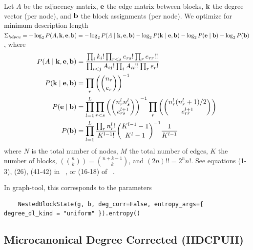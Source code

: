 \documentclass[aps,pre,superscriptaddress]{revtex4}
\begin{document}
Let $A$ be the adjacency matrix, $\vb{e}$ the edge matrix between blocks, $\vb{k}$ the degree vector (per node), and $\vb{b}$ the block assignments (per node).
We optimize for minimum description length $\Sigma_{hdpcu} = -\log_2P(A, \vb{k}, \vb{e}, \vb{b}) = -\log_2P(A \mid \vb{k}, \vb{e}, \vb{b}) - \log_2 P(\vb{k} \mid \vb{e}, \vb{b}) - \log_2 P(\vb{e} \mid \vb{b}) - \log_2 P(\vb{b}) $, where
\begin{align}
	P(A \mid \vb{k}, \vb{e}, \vb{b}) & = \frac{ \prod_i k_i! \prod_{r < s} e_{rs}! \prod_{r} e_{rr}!!} {\prod_{i < j} A_{ij}! \prod_i A_{ii}!! \prod_r e_r!}                                      \\
	P(\vb{k} \mid \vb{e}, \vb{b})    & = \prod_r \left( \binom{n_r}{e_r} \right)^{-1}                                                                                                             \\
	P(\vb{e} \mid \vb{b})            & = \prod_{l=1}^{L} \prod_{r < s} \left( \binom{n_r^l n_s^l}{e_{rs}^{l+1}} \right)^{-1} \prod_r \left( \binom{ n_r^l (n_r^l + 1) / 2 }{e_{rr}^{l+1} }\right) \\
	P(\vb{b})                        & = \prod_{l=1}^L \frac{\prod_r n_r^l!}{K^{l-1}!} \binom{ K^{l-1} - 1}{K^l - 1}^{-1} \frac{1}{K^{l-1}}
\end{align}
where $N$ is the total number of nodes, $M$ the total number of edges, $K$ the number of blocks, $\left( \binom{n}{k} \right) = \binom{n + k - 1}{k}$, and $(2n)!! = 2^n n!$.
See equations (1-3), (26), (41-42) in ~\cite{peixoto17-01}, or (16-18) of ~\cite{funke19-04}.

In graph-tool, this corresponds to the parameters
\begin{verbatim}
    NestedBlockState(g, b, deg_corr=False, entropy_args={ degree_dl_kind = "uniform" }).entropy()
\end{verbatim}

\subsection*{Microcanonical Degree Corrected (HDCPUH)}
\end{document}
